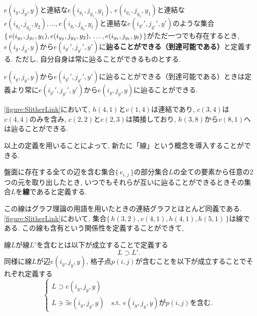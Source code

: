 \begin{definition}[到達可能]
  $e(i_y,j_y,y)$と連結な$e(i_{y_1},j_{y_1},y_1)$, $e(i_{y_1},j_{y_1},y_1)$と連結な$e(i_{y_2},j_{y_2},y_2),\ldots,e(i_{y_t},j_{y_t},y_t)$と連結な$e(i_{y'}',j_{y'}',y')$のような集合$\{\,e(i_{y_1},j_{y_1},y_1),e(i_{y_2},j_{y_2},y_2),\\
    \ldots,e(i_{y_t},j_{y_t},y_t)\,\}$がただ一つでも存在するとき, $e(i_y,j_y,y)$から$e(i_{y'}',j_{y'}',y')$に\textbf{辿ることができる（到達可能である）}と定義する. ただし, 自分自身は常に辿ることができるものとする.
\end{definition}

\begin{remark}
  $e(i_y,j_y,y)$から$e(i_{y'}',j_{y'}',y')$に辿ることができる（到達可能である）ときは定義より常に$e(i_{y'}',j_{y'}',y')$から$e(i_y,j_y,y)$に辿ることができる.
\end{remark}

\begin{example}[連結, 含有, 隣接, 到達可能]
  \cref{figure:SlitherLink}において, $h(4,1)$と$v(1,4)$は連結であり, $c(3,4)$は$v(4,4)$のみを含み, $c(2,2)$と$c(2,3)$は隣接しており, $h(3,8)$から$v(8,1)$へは辿ることができる.
\end{example}
以上の定義を用いることによって, 新たに「線」という概念を導入することができる.

\begin{definition}[線]\label{definition:Line}
  盤面に存在する全ての辺を含む集合$\{\,e_{i,j}\,\}$の部分集合$L$の全ての要素から任意の2つの元を取り出したとき, いつでもそれらが互いに辿ることができるときその集合$L$を\textbf{線}であると定義する.
\end{definition}
この線はグラフ理論の用語を用いたときの連結グラフとほとんど同義である. \cref{figure:SlitherLink}において, 集合$\{\,h(3,2),v(4,1),h(4,1),h(5,1)\,\}$は線である. この線も含有という関係性を定義することができて,
\begin{definition}[線の含有]
  線$L$が線$L'$を含むとは以下が成立することで定義する
  \begin{equation}
    L\supset L'.
  \end{equation}
  同様に線$L$が辺$e(i_y,j_y,y)$, 格子点$p(i,j)$が含むことを以下が成立することでそれぞれ定義する
  \begin{equation}
    \begin{cases}
      {L\supset  e(i_y,j_y,y) } \\
      {L\ni \exists e(i_y,j_y,y) \quad \mbox{s.t. $e(i_y,j_y,y)$が$p(i,j)$を含む}}.
    \end{cases}
  \end{equation}
\end{definition}

